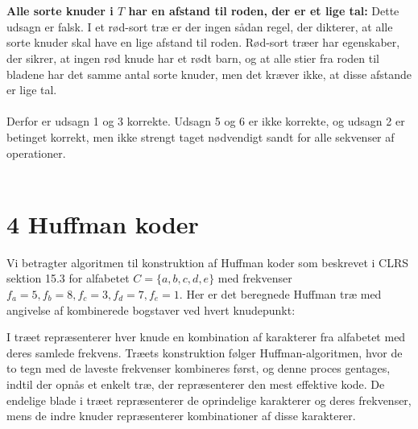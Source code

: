 \documentclass{article}
\begin{document}
\\
\\
\textbf{Alle sorte knuder i $T$ har en afstand til roden, der er et lige tal:}
Dette udsagn er falsk. I et rød-sort træ er der ingen sådan regel, der dikterer, at alle sorte knuder skal have en lige afstand til roden. Rød-sort træer har egenskaber, der sikrer, at ingen rød knude har et rødt barn, og at alle stier fra roden til bladene har det samme antal sorte knuder, men det kræver ikke, at disse afstande er lige tal.
\\
\\
Derfor er udsagn 1 og 3 korrekte. Udsagn 5 og 6 er ikke korrekte, og udsagn 2 er betinget korrekt, men ikke strengt taget nødvendigt sandt for alle sekvenser af operationer.
\\
\\

\section*{4 Huffman koder}



Vi betragter algoritmen til konstruktion af Huffman koder som beskrevet i CLRS sektion 15.3 for alfabetet $C=\{a, b, c, d, e\}$ med frekvenser $f_a=5, f_b=8, f_c=3, f_d=7, f_e=1$. Her er det beregnede Huffman træ med angivelse af kombinerede bogstaver ved hvert knudepunkt:

\begin{center}
\end{center}

I træet repræsenterer hver knude en kombination af karakterer fra alfabetet med deres samlede frekvens. Træets konstruktion følger Huffman-algoritmen, hvor de to tegn med de laveste frekvenser kombineres først, og denne proces gentages, indtil der opnås et enkelt træ, der repræsenterer den mest effektive kode. De endelige blade i træet repræsenterer de oprindelige karakterer og deres frekvenser, mens de indre knuder repræsenterer kombinationer af disse karakterer.
\\
\\
\end{document}
